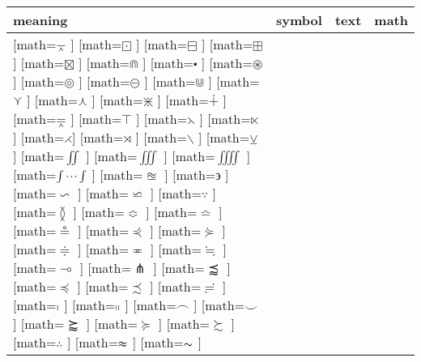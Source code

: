 \documentclass{unittest}
\begin{document}
\begin{tabular}{ll|ll|ll}  %
\toprule
meaning & symbol & \multicolumn{2}{c|}{\textbf{text}} & \multicolumn{2}{c}{\textbf{math}} \\
\midrule%
\makemath{⊼}[math=$\barwedge$       ]
\makemath{⊡}[math=$\boxdot$         ]
\makemath{⊟}[math=$\boxminus$       ]
\makemath{⊞}[math=$\boxplus$        ]
\makemath{⊠}[math=$\boxtimes$       ]
\makemath{⋒}[math=$\Cap$            ]
\makemath{}[math=$\centerdot$      ]
\makemath{⊛}[math=$\circledast$     ]
\makemath{⊚}[math=$\circledcirc$    ]
\makemath{⊖}[math=$\circleddash$    ]
\makemath{⋓}[math=$\Cup$            ]
\makemath{⋎}[math=$\curlyvee$       ]
\makemath{⋏}[math=$\curlywedge$     ]
\makemath{⋇}[math=$\divideontimes$  ]
\makemath{∔}[math=$\dotplus$        ]
\makemath{⩞}[math=$\doublebarwedge$ ]
\makemath{⊺}[math=$\intercal$       ]%
\makemath{⋋}[math=$\leftthreetimes$ ]
\makemath{⋉}[math=$\ltimes$         ]
\makemath{⋌}[math=$\rightthreetimes$]
\makemath{⋊}[math=$\rtimes$         ]
\makemath{}[math=$\smallsetminus$  ]
\makemath{⊻}[math=$\veebar$         ]
\midrule%
\makemath{∬}[math=$\iint$          ]
\makemath{∭}[math=$\iiint$         ]
\makemath{⨌}[math=$\iiiint$        ]
\makemath{}[math=$\idotsint$       ]
\midrule%
\makemath{≊}[math=$\approxeq$      ]
\makemath{϶}[math=$\backepsilon$   ]
\makemath{∽}[math=$\backsim$       ]
\makemath{⋍}[math=$\backsimeq$     ]
\makemath{∵}[math=$\because$       ]
\makemath{≬}[math=$\between$       ]
\makemath{≎}[math=$\Bumpeq$        ]
\makemath{≏}[math=$\bumpeq$        ]
\makemath{⊜}[math=$\circeq$        ]
\makemath{⋞}[math=$\curlyeqprec$   ]
\makemath{⋟}[math=$\curlyeqsucc$   ]
\makemath{≑}[math=$\doteqdot$      ]
\makemath{≖}[math=$\eqcirc$        ]
\makemath{≒}[math=$\fallingdotseq$ ]
\makemath{⊸}[math=$\multimap$      ]
\makemath{⋔}[math=$\pitchfork$     ]
\makemath{⪷}[math=$\precapprox$    ]
\makemath{≼}[math=$\preccurlyeq$   ]
\makemath{≾}[math=$\precsim$       ]
\makemath{≓}[math=$\risingdotseq$  ]
\makemath{}[math=$\shortmid$      ]
\makemath{}[math=$\shortparallel$ ]
\makemath{}[math=$\smallfrown$    ]
\makemath{}[math=$\smallsmile$    ]
\makemath{⪸}[math=$\succapprox$    ]
\makemath{≽}[math=$\succcurlyeq$   ]
\makemath{≿}[math=$\succsim$       ]
\makemath{∴}[math=$\therefore$     ]
\makemath{}[math=$\thickapprox$   ]
\makemath{}[math=$\thicksim$      ]

\end{tabular}
\end{document}
